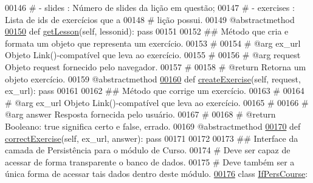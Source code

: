 \begin{DoxyCode}
00146     \textcolor{comment}{#                       - slides    : Número de slides da lição em questão;}
00147     \textcolor{comment}{#                       - exercises : Lista de ids de exercícios que a}
00148     \textcolor{comment}{#                                       lição possui.}
00149     @abstractmethod
\hypertarget{CourseUnit_8py_source_l00150}{}\hyperlink{classCourse_1_1CourseUnit_1_1IfBusCourse_a528e12ea84cb348f2c349613ed62f586}{00150}     \textcolor{keyword}{def }\hyperlink{classCourse_1_1CourseUnit_1_1IfBusCourse_a528e12ea84cb348f2c349613ed62f586}{getLesson}(self, lessonid): \textcolor{keyword}{pass}
00151 
00152     \textcolor{comment}{## Método que cria e formata um objeto que representa um exercício.}
00153     \textcolor{comment}{#}
00154     \textcolor{comment}{#   @arg ex\_url     Objeto Link()-compatível que leva ao exercício.}
00155     \textcolor{comment}{#   }
00156     \textcolor{comment}{#   @arg request    Objeto request fornecido pelo navegador.}
00157     \textcolor{comment}{#}
00158     \textcolor{comment}{#   @return         Retorna um objeto exercício.}
00159     @abstractmethod
\hypertarget{CourseUnit_8py_source_l00160}{}\hyperlink{classCourse_1_1CourseUnit_1_1IfBusCourse_a1467691a3312e00b43e92c30456d226f}{00160}     \textcolor{keyword}{def }\hyperlink{classCourse_1_1CourseUnit_1_1IfBusCourse_a1467691a3312e00b43e92c30456d226f}{createExercise}(self, request, ex\_url): \textcolor{keyword}{pass}
00161 
00162     \textcolor{comment}{## Método que corrige um exercício.}
00163     \textcolor{comment}{#}
00164     \textcolor{comment}{#   @arg ex\_url     Objeto Link()-compatível que leva ao exercício.}
00165     \textcolor{comment}{#}
00166     \textcolor{comment}{#   @arg answer     Resposta fornecida pelo usuário.}
00167     \textcolor{comment}{#}
00168     \textcolor{comment}{#   @return         Booleano: true significa certo e false, errado.}
00169     @abstractmethod
\hypertarget{CourseUnit_8py_source_l00170}{}\hyperlink{classCourse_1_1CourseUnit_1_1IfBusCourse_a2dab60981cdb691f1b95b5ed4a4022d8}{00170}     \textcolor{keyword}{def }\hyperlink{classCourse_1_1CourseUnit_1_1IfBusCourse_a2dab60981cdb691f1b95b5ed4a4022d8}{correctExercise}(self, ex\_url, answer): \textcolor{keyword}{pass}
00171 
00172 
00173 \textcolor{comment}{## Interface da camada de Persistência para o módulo de Curso.}
00174 \textcolor{comment}{#   Deve ser capaz de acessar de forma transparente o banco de dados.}
00175 \textcolor{comment}{#   Deve também ser a única forma de acessar tais dados dentro deste módulo.}
\hypertarget{CourseUnit_8py_source_l00176}{}\hyperlink{classCourse_1_1CourseUnit_1_1IfPersCourse}{00176} \textcolor{keyword}{class }\hyperlink{classCourse_1_1CourseUnit_1_1IfPersCourse}{IfPersCourse}:

\end{DoxyCode}
